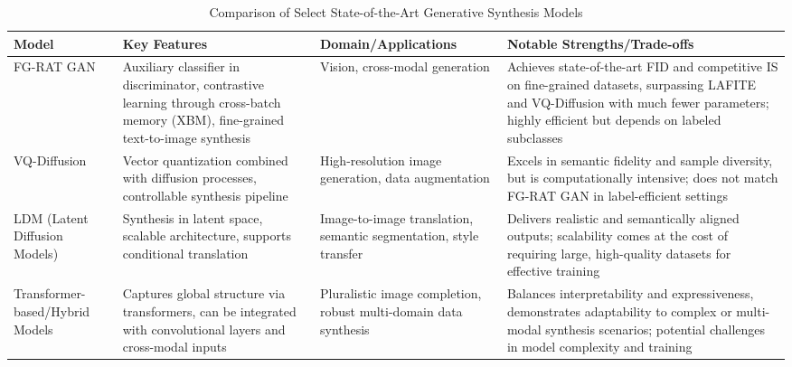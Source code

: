 \documentclass[sigconf]{acmart}
\begin{document}
\begin{table*}[htbp]
\centering
\caption{Comparison of Select State-of-the-Art Generative Synthesis Models}
\label{tab:sota_models}
\begin{adjustbox}{max width=\textwidth}
\begin{tabular}{@{}llll@{}}
\toprule
\textbf{Model} & \textbf{Key Features} & \textbf{Domain/Applications} & \textbf{Notable Strengths/Trade-offs} \\
\midrule
FG-RAT GAN~\cite{ref87} & Auxiliary classifier in discriminator, contrastive learning through cross-batch memory (XBM), fine-grained text-to-image synthesis & Vision, cross-modal generation & Achieves state-of-the-art FID and competitive IS on fine-grained datasets, surpassing LAFITE and VQ-Diffusion with much fewer parameters; highly efficient but depends on labeled subclasses~\cite{ref101} \\
VQ-Diffusion~\cite{ref82,ref87} & Vector quantization combined with diffusion processes, controllable synthesis pipeline & High-resolution image generation, data augmentation & Excels in semantic fidelity and sample diversity, but is computationally intensive; does not match FG-RAT GAN in label-efficient settings \\
LDM (Latent Diffusion Models)~\cite{ref82,ref101} & Synthesis in latent space, scalable architecture, supports conditional translation & Image-to-image translation, semantic segmentation, style transfer & Delivers realistic and semantically aligned outputs; scalability comes at the cost of requiring large, high-quality datasets for effective training \\
Transformer-based/Hybrid Models~\cite{ref64,ref81,ref102} & Captures global structure via transformers, can be integrated with convolutional layers and cross-modal inputs & Pluralistic image completion, robust multi-domain data synthesis & Balances interpretability and expressiveness, demonstrates adaptability to complex or multi-modal synthesis scenarios; potential challenges in model complexity and training \\
\bottomrule
\end{tabular}
\end{adjustbox}
\end{table*}
\end{document}
